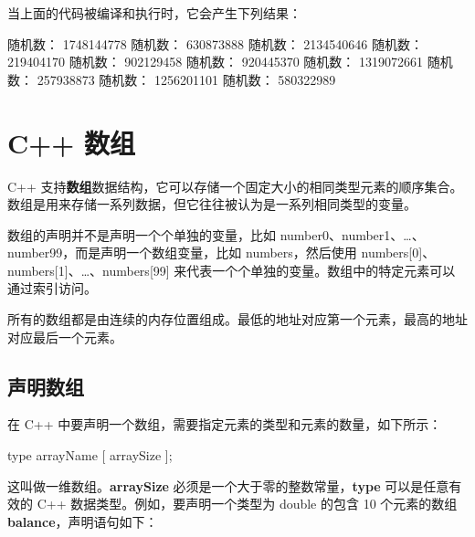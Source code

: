 \documentclass[
]{article}
\newenvironment{Shaded}{}{}
\newcommand{\DecValTok}[1]{\textcolor[rgb]{0.25,0.63,0.44}{#1}}
\newcommand{\NormalTok}[1]{#1}
\newcommand{\OperatorTok}[1]{\textcolor[rgb]{0.40,0.40,0.40}{#1}}
\begin{document}
当上面的代码被编译和执行时，它会产生下列结果：

\begin{Shaded}
\begin{Highlighting}[]
\NormalTok{随机数： }\DecValTok{1748144778}
\NormalTok{随机数： }\DecValTok{630873888}
\NormalTok{随机数： }\DecValTok{2134540646}
\NormalTok{随机数： }\DecValTok{219404170}
\NormalTok{随机数： }\DecValTok{902129458}
\NormalTok{随机数： }\DecValTok{920445370}
\NormalTok{随机数： }\DecValTok{1319072661}
\NormalTok{随机数： }\DecValTok{257938873}
\NormalTok{随机数： }\DecValTok{1256201101}
\NormalTok{随机数： }\DecValTok{580322989}
\end{Highlighting}
\end{Shaded}

\hypertarget{c-ux6570ux7ec4}{%
\section{C++ 数组}\label{c-ux6570ux7ec4}}

C++
支持\textbf{数组}数据结构，它可以存储一个固定大小的相同类型元素的顺序集合。数组是用来存储一系列数据，但它往往被认为是一系列相同类型的变量。

数组的声明并不是声明一个个单独的变量，比如
number0、number1、\ldots、number99，而是声明一个数组变量，比如
numbers，然后使用
numbers{[}0{]}、numbers{[}1{]}、\ldots、numbers{[}99{]}
来代表一个个单独的变量。数组中的特定元素可以通过索引访问。

所有的数组都是由连续的内存位置组成。最低的地址对应第一个元素，最高的地址对应最后一个元素。

\hypertarget{ux58f0ux660eux6570ux7ec4}{%
\subsection{声明数组}\label{ux58f0ux660eux6570ux7ec4}}

在 C++ 中要声明一个数组，需要指定元素的类型和元素的数量，如下所示：

\begin{Shaded}
\begin{Highlighting}[]
\NormalTok{type arrayName }\OperatorTok{[}\NormalTok{ arraySize }\OperatorTok{];}
\end{Highlighting}
\end{Shaded}

这叫做一维数组。\textbf{arraySize}
必须是一个大于零的整数常量，\textbf{type} 可以是任意有效的 C++
数据类型。例如，要声明一个类型为 double 的包含 10 个元素的数组
\textbf{balance}，声明语句如下：
\end{document}
